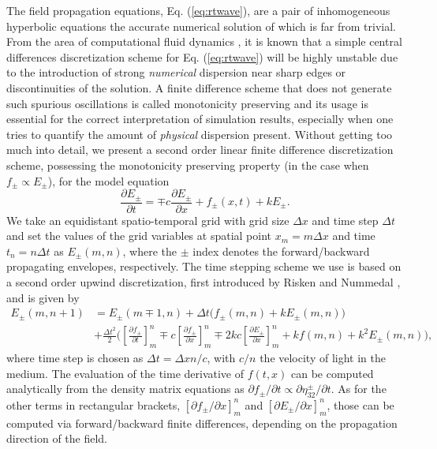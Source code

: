 \documentclass[10pt,letterpaper]{article}
\def\p{\partial}
\begin{document}
{\begin{appendices}
The field propagation equations, Eq. (\ref{eq:rtwave}), are a pair of inhomogeneous hyperbolic equations the accurate numerical solution of which is far from trivial. From the area of computational fluid dynamics \cite{wesseling2009principles}, it is known that a simple central differences discretization scheme for Eq. (\ref{eq:rtwave}) will be highly unstable due to the introduction of strong \emph{numerical} dispersion near sharp edges or discontinuities of the solution. A finite difference scheme that does not generate such spurious oscillations is called monotonicity preserving \cite{wesseling2009principles} and its usage is essential for the correct interpretation of simulation results, especially when one tries to quantify the amount of \emph{physical} dispersion present. Without getting too much into detail, we present a second order linear finite difference discretization scheme, possessing the monotonicity preserving property (in the case when $f_\pm \propto E_\pm$),  for the model equation
\begin{equation}
\label{eq:genericwave}
\frac{\partial E_{\pm}}{\partial t}  = \mp c\frac{\partial E_{\pm} }{\partial x} +f_{\pm}(x,t) + k E_{\pm}.
\end{equation}
We take an equidistant spatio-temporal grid with grid size $\Delta x$ and time step $\Delta t$ and set the values of the grid variables at spatial point $x_m=m \Delta x $  and time $t_n = n\Delta t$ as $E_{\pm}(m,n)$, where the $\pm$ index denotes the forward/backward propagating envelopes, respectively. The time stepping scheme we use is based on a second order upwind discretization, first introduced by Risken and Nummedal \cite{risken1968self}, and is given by
\begin{align}
\label{eq:riskennummedal}
E_{\pm}(m,n+1) &= E_{\pm}(m \mp 1,n) + \Delta t \big ( f_{\pm}(m,n) +k E_{\pm}(m,n) \big ) \nonumber \\ 
& + \frac{\Delta t^2} {2} \Bigg ( \left [  \frac{\partial f_{\pm} }{\partial t} \right]_m^n \mp  c \left [  \frac{\partial f_{\pm} }{\partial x} \right]_m^n 
\mp 2kc \left[ \frac{\partial E_{\pm} }{\partial x} \right]_m^n  + kf(m,n) + k^2 E_{\pm} (m,n) \Bigg ),
\end{align} 
where time step is chosen as $\Delta t = \Delta x n/c$, with $c/n$ the velocity of light in the medium. The evaluation of the time derivative of $f(t,x)$ can be computed analytically from the density matrix equations as $\p f_{\pm}/\p t \propto \p \eta_{32}^{\pm}/\p t$. As for the other terms in rectangular brackets, $\left [ \partial f_{\pm} /\partial x \right]_m^n$ and  $\left[ \partial E_{\pm}/\partial x \right]_m^n$, those can be computed via forward/backward finite differences, depending on the propagation direction of the field. 


\end{appendices}}
\end{document}
